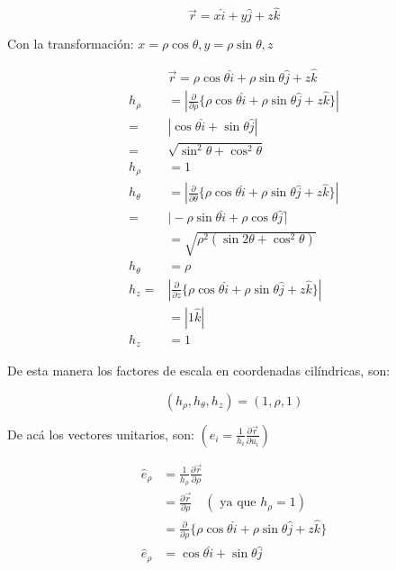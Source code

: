 $$
\vec{r}=x \hat{i}+y \hat{j}+z \hat{k}
$$

Con la transformación: $x=\rho \cos \theta, y=\rho \sin \theta, z$

$$
\begin{aligned}
& \vec{r}=\rho \cos \theta \hat{i}+\rho \sin \theta \hat{j}+z \hat{k} \\
h_{\rho} & =\left|\frac{\partial}{\partial \rho}\{\rho \cos \theta \hat{i}+\rho \sin \theta \hat{j}+z \hat{k}\}\right| \\
= & |\cos \theta \hat{i}+\sin \theta \hat{j}| \\
= & \sqrt{\sin ^{2} \theta+\cos ^{2} \theta} \\
h_{\rho} & =1 \\
h_{\theta} & =\left|\frac{\partial}{\partial \theta}\{\rho \cos \theta \hat{i}+\rho \sin \theta \hat{j}+z \hat{k}\}\right| \\
= & \mid-\rho \sin \theta \hat{i}+\rho \cos \theta \hat{j}\rceil \\
& =\sqrt{\rho^{2}\left(\sin 2 \theta+\cos ^{2} \theta\right)} \\
h_{\theta} & =\rho \\
h_{z}= & \left|\frac{\partial}{\partial z}\{\rho \cos \theta \hat{i}+\rho \sin \theta \hat{j}+z \hat{k}\}\right| \\
& =|1 \hat{k}| \\
h_{z} & =1
\end{aligned}
$$

De esta manera los factores de escala en coordenadas cilíndricas, son:

$$
\left(h_{\rho}, h_{\theta}, h_{z}\right)=(1, \rho, 1)
$$

De acá los vectores unitarios, son: $\left(\widehat{e}_{i}=\frac{1}{h_{i}} \frac{\partial \vec{r}}{\partial u_{i}}\right)$

$$
\begin{aligned}
\widehat{e}_{\rho} & =\frac{1}{h_{\rho}} \frac{\partial \vec{r}}{\partial \rho} \\
& =\frac{\partial \vec{r}}{\partial \rho} \quad\left(\text { ya que } h_{\rho}=1\right) \\
& =\frac{\partial}{\partial \rho}\{\rho \cos \theta \hat{i}+\rho \sin \theta \hat{j}+z \hat{k}\} \\
\hat{e}_{\rho} & =\cos \theta \hat{i}+\sin \theta \hat{j}
\end{aligned}
$$

